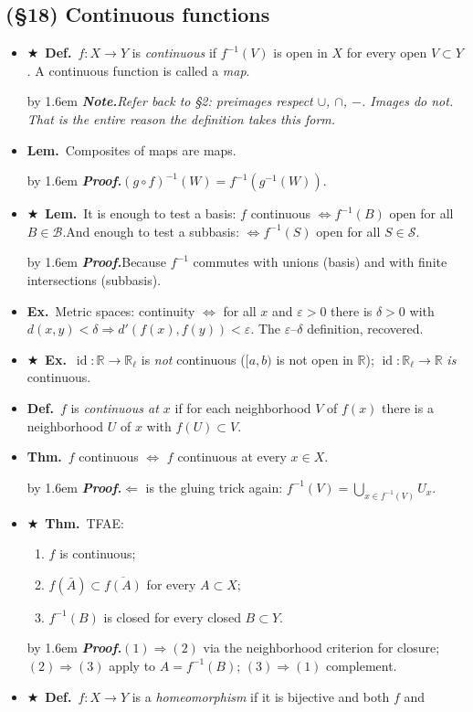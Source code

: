 \documentclass[12pt,a4paper]{article}
\newcommand{\Dfn}{\textbf{Def.}~}
\newcommand{\Thm}{\textbf{Thm.}~}
\newcommand{\Lem}{\textbf{Lem.}~}
\newcommand{\Exa}{\textbf{Ex.}~}
\newcommand{\Key}{$\bigstar$~}                  %
\newcommand{\Pf}[1]{%
  \par\addvspace{7pt}\nopagebreak
  \begingroup
    \advance\leftskip by 1.6em
    \parindent=0pt \small\color{prf}%
    \textbf{\textit{Proof.}}\enspace #1\par
  \endgroup
  \addvspace{9pt}}
\newcommand{\Cue}[1]{%
  \par\addvspace{7pt}\nopagebreak
  \begingroup
    \advance\leftskip by 1.6em
    \parindent=0pt \small\color{cue}%
    \textbf{\textit{Note.}}\enspace \textit{#1}\par
  \endgroup
  \addvspace{9pt}}
\newenvironment{BL}%
  {\begin{itemize}[leftmargin=1.4em,labelsep=0.55em,itemsep=11pt,topsep=11pt,parsep=0pt]}%
  {\end{itemize}}
\newenvironment{NL}%
  {\begin{enumerate}[label=(\arabic*),leftmargin=2em,labelsep=0.45em,itemsep=6pt,topsep=7pt,parsep=0pt]}%
  {\end{enumerate}}
\newcommand{\RR}{\mathbb{R}}
\newcommand{\cB}{\mathcal{B}}
\newcommand{\cS}{\mathcal{S}}
\DeclareMathOperator{\id}{id}
\renewcommand{\iff}{\Leftrightarrow}
\newcommand{\imp}{\Rightarrow}
\begin{document}
\subsection{(\S18) Continuous functions}

\begin{BL}
\item \Key\Dfn $f\colon X\to Y$ is \emph{continuous} if $f^{-1}(V)$ is open in $X$ for every
      open $V\subset Y$. A continuous function is called a \emph{map}.
\Cue{Refer back to \S2: preimages respect $\cup$, $\cap$, $-$. Images do not. That is the
entire reason the definition takes this form.}
\item \Lem Composites of maps are maps. \Pf{$(g\circ f)^{-1}(W)=f^{-1}(g^{-1}(W))$.}
\item \Key\Lem It is enough to test a basis: $f$ continuous $\iff f^{-1}(B)$ open for all
      $B\in\cB$.\quad And enough to test a subbasis: $\iff f^{-1}(S)$ open for all $S\in\cS$.
\Pf{Because $f^{-1}$ commutes with unions (basis) and with finite intersections (subbasis).}
\item \Exa Metric spaces: continuity $\iff$ for all $x$ and $\varepsilon>0$ there is $\delta>0$ with
      $d(x,y)<\delta\imp d'(f(x),f(y))<\varepsilon$. The $\varepsilon$--$\delta$ definition, recovered.
\item \Key\Exa $\id\colon\RR\to\RR_\ell$ is \emph{not} continuous ($[a,b)$ is not open in $\RR$);
      $\id\colon\RR_\ell\to\RR$ \emph{is} continuous.
\item \Dfn $f$ is \emph{continuous at $x$} if for each neighborhood $V$ of $f(x)$ there is a
      neighborhood $U$ of $x$ with $f(U)\subset V$.
\item \Thm $f$ continuous $\iff$ $f$ continuous at every $x\in X$.
\Pf{$\Leftarrow$ is the gluing trick again: $f^{-1}(V)=\bigcup_{x\in f^{-1}(V)}U_x$.}
\item \Key\Thm TFAE:
  \begin{NL}
  \item $f$ is continuous;
  \item $f(\bar A)\subset\overline{f(A)}$ for every $A\subset X$;
  \item $f^{-1}(B)$ is closed for every closed $B\subset Y$.
  \end{NL}
\Pf{$(1)\imp(2)$ via the neighborhood criterion for closure;
$(2)\imp(3)$ apply to $A=f^{-1}(B)$;
$(3)\imp(1)$ complement.}
\item \Key\Dfn $f\colon X\to Y$ is a \emph{homeomorphism} if it is bijective and both $f$ and

\end{BL}
\end{document}
